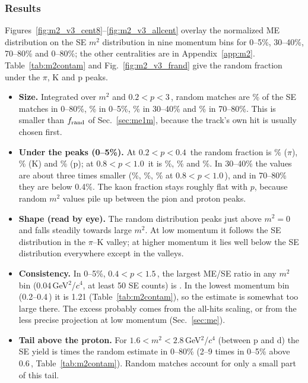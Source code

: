 \subsubsection{Results}
Figures~\ref{fig:m2_v3_cent8}--\ref{fig:m2_v3_allcent} overlay the normalized ME distribution on the SE $m^2$
distribution in nine momentum bins for 0--5\%, 30--40\%, 70--80\% and 0--80\%; the other centralities are in
Appendix~\ref{app:m2}. Table~\ref{tab:m2contam} and Fig.~\ref{fig:m2_v3_frand} give the random fraction under the
$\pi$, K and p peaks.

\begin{itemize}
\item \textbf{Size.} Integrated over $m^2$ and $0.2<p<3$\,\GeVc, random matches are \mtMENormFracVthree\% of the SE
  matches in 0--80\%, \mtMENormFracCiVthree\% in 0--5\%, \mtMENormFracCeVthree\% in 30--40\% and \mtMENormFracCaVthree\% in 70--80\%.
  This is smaller than $f_{\rm rand}$ of Sec.~\ref{sec:me1m}, because the track's own hit is usually chosen first.
\item \textbf{Under the peaks (0--5\%).} At $0.2<p<0.4$\,\GeVc{} the random fraction is \mtFrPiLoCiVthree\% ($\pi$),
  \mtFrKLoCiVthree\% (K) and \mtFrPLoCiVthree\% (p); at $0.8<p<1.0$\,\GeVc{} it is \mtFrPiMidCiVthree\%, \mtFrKMidCiVthree\% and
  \mtFrPMidCiVthree\%. In 30--40\% the values are about three times smaller (\mtFrPiMidCeVthree\%, \mtFrKMidCeVthree\%,
  \mtFrPMidCeVthree\% at $0.8<p<1.0$\,\GeVc), and in 70--80\% they are below 0.4\%. The kaon fraction stays roughly flat
  with $p$, because random $m^2$ values pile up between the pion and proton peaks.
\item \textbf{Shape (read by eye).} The random distribution peaks just above $m^2=0$ and falls steadily towards large
  $m^2$. At low momentum it follows the SE distribution in the $\pi$--K valley; at higher momentum it lies well below
  the SE distribution everywhere except in the valleys.
\item \textbf{Consistency.} In 0--5\%, $0.4<p<1.5$\,\GeVc, the largest ME/SE ratio in any $m^2$ bin (0.04\,GeV$^2$/$c^4$,
  at least 50 SE counts) is \mtValleyAllVthree. In the lowest momentum bin (0.2--0.4\,\GeVc) it is 1.21
  (Table~\ref{tab:m2contam}), so the estimate is somewhat too large there. The excess probably comes from the all-hits
  scaling, or from the less precise projection at low momentum (Sec.~\ref{sec:me}).
\item \textbf{Tail above the proton.} For $1.6<m^2<2.8$\,GeV$^2$/$c^4$ (between p and d) the SE yield is \mtSbRatioAllVthree{}
  times the random estimate in 0--80\% (2--9 times in 0--5\% above 0.6\,\GeVc, Table~\ref{tab:m2contam}). Random matches account for only a small
  part of this tail.
\end{itemize}


